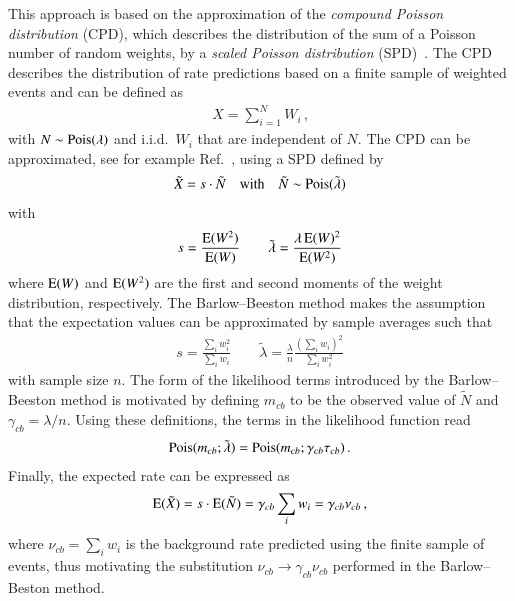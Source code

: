 This approach is based on the approximation of the \emph{compound Poisson
  distribution} (CPD), which describes the distribution of the sum of a Poisson
number of random weights, by a \emph{scaled Poisson distribution}
(SPD)~\cite{Bohm:2013gla}. The CPD describes the distribution of rate
predictions based on a finite sample of weighted events and can be defined as
\begin{align*}
  X = \sum_{i = 1}^{N} W_i \,\text{,}  %
\end{align*}
with $N \sim \operatorname{Pois}(\lambda)$ and i.i.d.\ $W_i$ that are independent of $N$. The
CPD can be approximated, see for example Ref.~\cite{Bohm:2013gla}, using a SPD
defined by
\begin{align*}
  \tilde{X} = s \cdot \tilde{N} \quad \text{with} \quad \tilde{N} \sim \operatorname{Pois}(\tilde{\lambda})
\end{align*}
with
\begin{align*}
  s = \frac{\operatorname{E}(W^2)}{\operatorname{E}(W)} \qquad \tilde{\lambda} = \frac{\lambda \operatorname{E}(W)^2}{\operatorname{E}(W^2)}
\end{align*}
where $\operatorname{E}(W)$ and $\operatorname{E}(W^2)$ are the first and second moments of the
weight distribution, respectively. The Barlow--Beeston method makes the
assumption that the expectation values can be approximated by sample averages
such that
\begin{align*}
  s = \frac{\sum_i w_i^2}{\sum_i w_i} \qquad \tilde{\lambda} = \frac{\lambda}{n} \frac{(\sum_i w_i)^2}{\sum_i w_i^2}
\end{align*}
with sample size $n$. The form of the likelihood terms introduced by the
Barlow--Beeston method is motivated by defining $m_{cb}$ to be the observed
value of $\tilde{N}$ and $\gamma_{cb} = \lambda / n$. Using these definitions,
the terms in the likelihood function read
\begin{align*}
  \operatorname{Pois}(m_{cb}; \tilde{\lambda}) = \operatorname{Pois}(m_{cb}; \gamma_{cb} \tau_{cb}) \,\text{.}
\end{align*}
Finally, the expected rate can be expressed as
\begin{align*}
  \operatorname{E}(\tilde{X}) = s \cdot \operatorname{E}(\tilde{N}) = \gamma_{cb} \sum_i w_i =
  \gamma_{cb} \nu_{cb} \,\text{,}
\end{align*}
where $\nu_{cb} = \sum_i w_i$ is the background rate predicted using the finite
sample of events, thus motivating the substitution
$\nu_{cb} \to \gamma_{cb} \nu_{cb}$ performed in the Barlow--Beston method.

